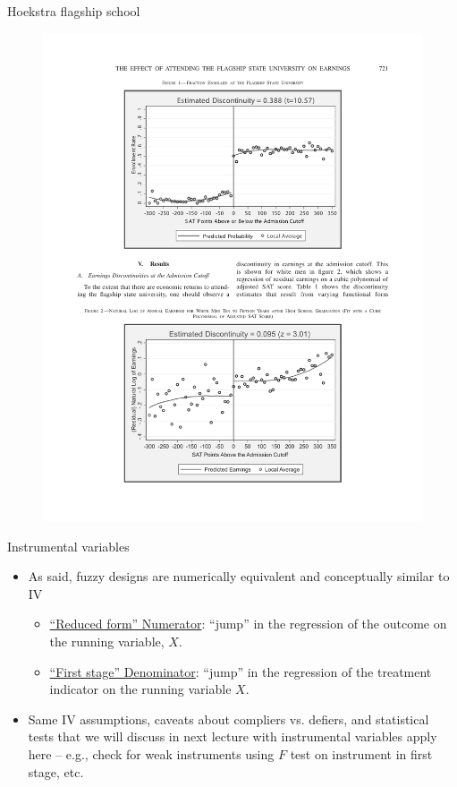 \documentclass{beamer}
\begin{document}
\begin{frame}{Hoekstra flagship school}

	\begin{figure}
	\includegraphics[scale=0.75]{./lecture_includes/rdd_hoekstra1.pdf}
	\end{figure}

\end{frame}

\begin{frame}{Instrumental variables}

	\begin{itemize}
	\item As said, fuzzy designs are numerically equivalent and conceptually similar to IV
		\begin{itemize}
		\item \underline{``Reduced form'' Numerator}: ``jump'' in the regression of the outcome on the running variable, $X$.
		\item \underline{``First stage'' Denominator}: ``jump'' in the regression of the treatment indicator on the running variable $X$.
		\end{itemize}
	\item Same IV assumptions, caveats about compliers vs. defiers, and statistical tests that we will discuss in next lecture with instrumental variables apply here -- e.g., check for weak instruments using $F$ test on instrument in first stage, etc.
	\end{itemize}

\end{frame}
\end{document}
